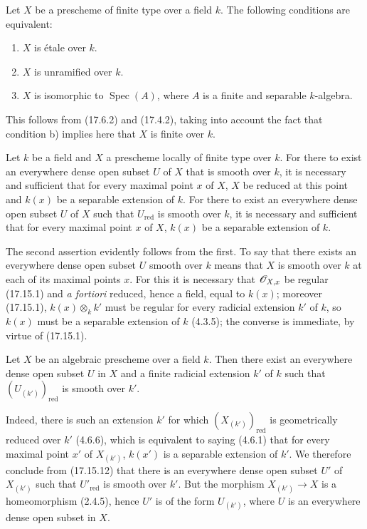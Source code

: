 \begin{proposition}[17.15.11]
\label{IV.17.15.11}
Let $X$ be a prescheme of finite type over a field $k$. The following conditions are equivalent:
\begin{enumerate}
  \item[a)] $X$ is étale over $k$.
  \item[b)] $X$ is unramified over $k$.
  \item[c)] $X$ is isomorphic to $\operatorname{Spec}(A)$, where $A$ is a finite and separable $k$-algebra.
\end{enumerate}
\end{proposition}

This follows from (17.6.2) and (17.4.2), taking into account the fact that condition b) implies here that $X$ is finite over $k$.

\begin{proposition}[17.15.12]
\label{IV.17.15.12}
Let $k$ be a field and $X$ a prescheme locally of finite type over $k$. For there to exist an everywhere dense open subset $U$ of $X$ that is smooth over $k$, it is necessary and sufficient that for every maximal point $x$ of $X$, $X$ be reduced at this point and $k(x)$ be a separable extension of $k$. For there to exist an everywhere dense open subset $U$ of $X$ such that $U_{\mathrm{red}}$ is smooth over $k$, it is necessary and sufficient that for every maximal point $x$ of $X$, $k(x)$ be a separable extension of $k$.
\end{proposition}

The second assertion evidently follows from the first. To say that there exists an everywhere dense open subset $U$ smooth over $k$ means that $X$ is smooth over $k$ at each of its maximal points $x$. For this it is necessary that $\mathscr{O}_{X,x}$ be regular (17.15.1) and \emph{a fortiori} reduced, hence a field, equal to $k(x)$; moreover (17.15.1), $k(x)\otimes_k k'$ must be regular for every radicial extension $k'$ of $k$, so $k(x)$ must be a separable extension of $k$ (4.3.5); the converse is immediate, by virtue of (17.15.1).

\begin{corollary}[17.15.13]
\label{IV.17.15.13}
Let $X$ be an algebraic prescheme over a field $k$. Then there exist an everywhere dense open subset $U$ in $X$ and a finite radicial extension $k'$ of $k$ such that $(U_{(k')})_{\mathrm{red}}$ is smooth over $k'$.
\end{corollary}

Indeed, there is such an extension $k'$ for which $(X_{(k')})_{\mathrm{red}}$ is geometrically reduced over $k'$ (4.6.6), which is equivalent to saying (4.6.1) that for every maximal point $x'$ of $X_{(k')}$, $k(x')$ is a separable extension of $k'$. We therefore conclude from (17.15.12) that there is an everywhere dense open subset $U'$ of $X_{(k')}$ such that $U'_{\mathrm{red}}$ is smooth over $k'$. But the morphism $X_{(k')}\to X$ is a homeomorphism (2.4.5), hence $U'$ is of the form $U_{(k')}$, where $U$ is an everywhere dense open subset in $X$.

